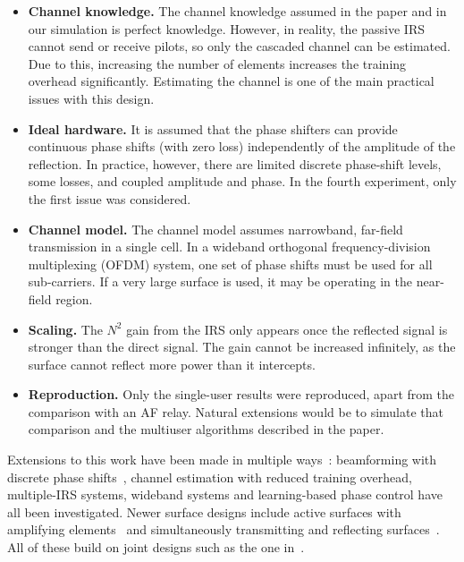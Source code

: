 \documentclass[11pt,a4paper]{article}
\begin{document}
\begin{itemize}[leftmargin=1.4em,itemsep=2pt]
\item \textbf{Channel knowledge.} The channel knowledge assumed in the paper and in our simulation is
perfect knowledge. However, in reality, the passive IRS cannot send or receive pilots, so only the
cascaded channel can be estimated. Due to this, increasing the number of elements increases the
training overhead significantly. Estimating the channel is one of the main practical issues with this
design.
\item \textbf{Ideal hardware.} It is assumed that the phase shifters can provide continuous phase
shifts (with zero loss) independently of the amplitude of the reflection. In practice, however, there
are limited discrete phase-shift levels, some losses, and coupled amplitude and phase. In the fourth
experiment, only the first issue was considered.
\item \textbf{Channel model.} The channel model assumes narrowband, far-field transmission in a single
cell. In a wideband orthogonal frequency-division multiplexing (OFDM) system, one set of phase shifts must be used for all sub-carriers. If a very
large surface is used, it may be operating in the near-field region.
\item \textbf{Scaling.} The $N^2$ gain from the IRS only appears once the reflected signal is stronger
than the direct signal. The gain cannot be increased infinitely, as the surface cannot reflect more
power than it intercepts.
\item \textbf{Reproduction.} Only the single-user results were reproduced, apart from the comparison
with an AF relay. Natural extensions would be to simulate that comparison and the multiuser algorithms
described in the paper.
\end{itemize}

Extensions to this work have been made in multiple ways~\cite{wu_tutorial}: beamforming with discrete
phase shifts~\cite{wu_discrete}, channel estimation with reduced training overhead, multiple-IRS
systems, wideband systems and learning-based phase control have all been investigated. Newer surface
designs include active surfaces with amplifying elements~\cite{zhang_active} and simultaneously
transmitting and reflecting surfaces~\cite{liu_star}. All of these build on joint designs such as the
one in~\cite{wu}.
\end{document}
